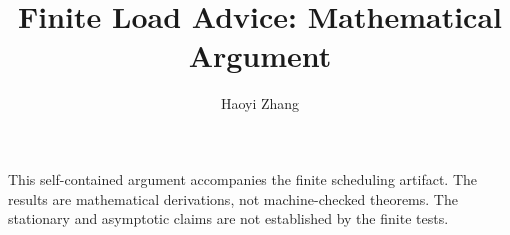 \documentclass[11pt]{article}
\title{Finite Load Advice: Mathematical Argument}
\author{Haoyi Zhang}
\date{}
\theoremstyle{remark}
\numberwithin{equation}{section}
\begin{document}
\maketitle
This self-contained argument accompanies the finite scheduling artifact.
The results are mathematical derivations, not machine-checked theorems.
The stationary and asymptotic claims are not established by the finite tests.











\end{document}
